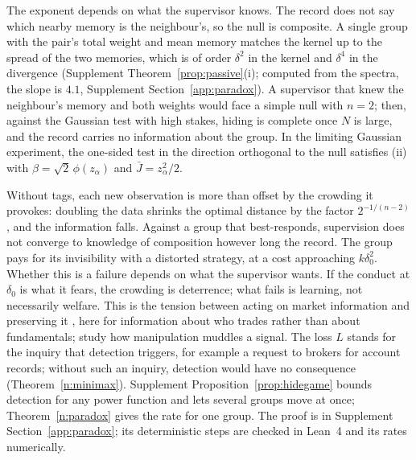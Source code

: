 \documentclass[12pt]{article}
\theoremstyle{definition}
\theoremstyle{remark}
\begin{document}
The exponent depends on what the supervisor knows. The record does not say which nearby memory is the neighbour's, so the null is composite. A single group with the pair's total weight and mean memory matches the kernel up to the spread of the two memories, which is of order $\delta^2$ in the kernel and $\delta^4$ in the divergence (Supplement Theorem~\ref{prop:passive}(i); computed from the spectra, the slope is $4.1$, Supplement Section~\ref{app:paradox}). A supervisor that knew the neighbour's memory and both weights would face a simple null with $n=2$; then, against the Gaussian test with high stakes, hiding is complete once $N$ is large, and the record carries no information about the group. In the limiting Gaussian experiment, the one-sided test in the direction orthogonal to the null satisfies (ii) with $\beta=\sqrt2\,\phi(z_\alpha)$ and $\bar J=z_\alpha^2/2$.

Without tags, each new observation is more than offset by the crowding it provokes: doubling the data shrinks the optimal distance by the factor $2^{-1/(n-2)}$, and the information falls. Against a group that best-responds, supervision does not converge to knowledge of composition however long the record. The group pays for its invisibility with a distorted strategy, at a cost approaching $k\delta_0^2$. Whether this is a failure depends on what the supervisor wants. If the conduct at $\delta_0$ is what it fears, the crowding is deterrence; what fails is learning, not necessarily welfare. This is the tension between acting on market information and preserving it \citep{bond2010,bond2015}, here for information about who trades rather than about fundamentals; \citet{frankel2019} study how manipulation muddles a signal. The loss $L$ stands for the inquiry that detection triggers, for example a request to brokers for account records; without such an inquiry, detection would have no consequence (Theorem~\ref{n:minimax}). Supplement Proposition~\ref{prop:hidegame} bounds detection for any power function and lets several groups move at once; Theorem~\ref{n:paradox} gives the rate for one group. The proof is in Supplement Section~\ref{app:paradox}; its deterministic steps are checked in Lean~4 and its rates numerically.
\end{document}
